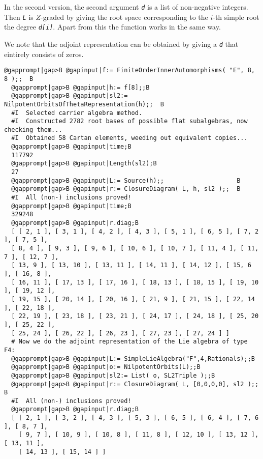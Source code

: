 \documentclass[a4paper,11pt]{report}
\begin{document}
{{{ In the second version, the second argument \mbox{\texttt{\mdseries\slshape d}} is a list of non-negative integers. Then \mbox{\texttt{\mdseries\slshape L}} is $Z$-graded by giving the root space corresponding to the $i$-th simple root the degree \mbox{\texttt{\mdseries\slshape d[i]}}. Apart from this the function works in the same way. 

 We note that the adjoint representation can be obtained by giving a \mbox{\texttt{\mdseries\slshape d}} that eintirely consists of zeros. 
\begin{Verbatim}[commandchars=@|B,fontsize=\small,frame=single,label=Example]
  @gapprompt|gap>B @gapinput|f:= FiniteOrderInnerAutomorphisms( "E", 8, 8 );;  B
  @gapprompt|gap>B @gapinput|h:= f[8];;B
  @gapprompt|gap>B @gapinput|sl2:= NilpotentOrbitsOfThetaRepresentation(h);;  B
  #I  Selected carrier algebra method.
  #I  Constructed 2782 root bases of possible flat subalgebras, now checking them...
  #I  Obtained 58 Cartan elements, weeding out equivalent copies...
  @gapprompt|gap>B @gapinput|time;B
  117792
  @gapprompt|gap>B @gapinput|Length(sl2);B
  27
  @gapprompt|gap>B @gapinput|L:= Source(h);;                    B
  @gapprompt|gap>B @gapinput|r:= ClosureDiagram( L, h, sl2 );;  B
  #I  All (non-) inclusions proved!
  @gapprompt|gap>B @gapinput|time;B
  329248
  @gapprompt|gap>B @gapinput|r.diag;B
  [ [ 2, 1 ], [ 3, 1 ], [ 4, 2 ], [ 4, 3 ], [ 5, 1 ], [ 6, 5 ], [ 7, 2 ], [ 7, 5 ], 
  [ 8, 4 ], [ 9, 3 ], [ 9, 6 ], [ 10, 6 ], [ 10, 7 ], [ 11, 4 ], [ 11, 7 ], [ 12, 7 ], 
  [ 13, 9 ], [ 13, 10 ], [ 13, 11 ], [ 14, 11 ], [ 14, 12 ], [ 15, 6 ], [ 16, 8 ], 
  [ 16, 11 ], [ 17, 13 ], [ 17, 16 ], [ 18, 13 ], [ 18, 15 ], [ 19, 10 ], [ 19, 12 ], 
  [ 19, 15 ], [ 20, 14 ], [ 20, 16 ], [ 21, 9 ], [ 21, 15 ], [ 22, 14 ], [ 22, 18 ], 
  [ 22, 19 ], [ 23, 18 ], [ 23, 21 ], [ 24, 17 ], [ 24, 18 ], [ 25, 20 ], [ 25, 22 ], 
  [ 25, 24 ], [ 26, 22 ], [ 26, 23 ], [ 27, 23 ], [ 27, 24 ] ]
  # Now we do the adjoint representation of the Lie algebra of type F4:
  @gapprompt|gap>B @gapinput|L:= SimpleLieAlgebra("F",4,Rationals);;B
  @gapprompt|gap>B @gapinput|o:= NilpotentOrbits(L);;B
  @gapprompt|gap>B @gapinput|sl2:= List( o, SL2Triple );;B
  @gapprompt|gap>B @gapinput|r:= ClosureDiagram( L, [0,0,0,0], sl2 );;      B
  #I  All (non-) inclusions proved!
  @gapprompt|gap>B @gapinput|r.diag;B
  [ [ 2, 1 ], [ 3, 2 ], [ 4, 3 ], [ 5, 3 ], [ 6, 5 ], [ 6, 4 ], [ 7, 6 ], [ 8, 7 ], 
    [ 9, 7 ], [ 10, 9 ], [ 10, 8 ], [ 11, 8 ], [ 12, 10 ], [ 13, 12 ], [ 13, 11 ], 
    [ 14, 13 ], [ 15, 14 ] ]
\end{Verbatim}
 }

}}
\end{document}

